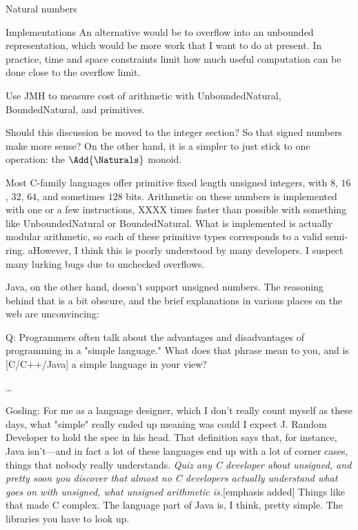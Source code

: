 \documentclass[12pt]{PalisadesLakesBook}
\begin{document}
\begin{plSection}{Natural numbers}
\begin{plSection}{Implementations}
An alternative would be to overflow into an unbounded 
representation, which would be more work that I want to do 
at present.
In practice, time and space constraints limit how much useful
computation can be done close to the overflow limit.

\TODO Use JMH to measure cost of arithmetic with
{\javaFont UnboundedNatural},
{\javaFont BoundedNatural},
and primitives.

\TODO Should this discussion be moved to the integer section?
So that signed numbers make more sense? On the other hand, 
it is a simpler to just stick to one operation:
the $\Add{\Naturals}$ monoid.


Most C-family languages offer primitive fixed length
unsigned integers, with $8$, $16$, $32$, $64$, and 
sometimes $128$ bits.
Arithmetic on these numbers is implemented with one or a few
instructions, XXXX times faster than possible with something
like {\javaFont UnboundedNatural} or
{\javaFont BoundedNatural}.
What is implemented is actually modular arithmetic,
so each of these primitive types corresponds to a valid
semi-ring.
aHowever, I think this is poorly understood by many developers.
I suspect many lurking bugs due to unchecked overflows.

Java, on the other hand, doesn't support unsigned numbers.
The reasoning behind that is a bit obscure,
and the brief explanations in various places on the web
are unconvincing:

\begin{plQuote}
{}{}%
{%
Q: Programmers often talk about the advantages and disadvantages 
of programming in a "simple language."  
What does that phrase mean to you, and is [C/C++/Java] 
a simple language in your view? 

\ldots

Gosling: For me as a language designer, 
which I don't really count myself as these days, 
what "simple" really ended up meaning was could I expect 
J. Random Developer to hold the spec in his head. 
That definition says that, for instance, Java isn't---and 
in fact a lot of these languages end up 
with a lot of corner cases, things that nobody really understands. 
\emph{Quiz any C developer about unsigned, 
and pretty soon you discover 
that almost no C developers actually understand what goes on 
with unsigned, what unsigned arithmetic is.}[emphasis added] 
Things like that made C complex. 
The language part of Java is, I think, pretty simple. 
The libraries you have to look up.}


\end{plQuote}
\end{plSection}
\end{plSection}
\end{document}
